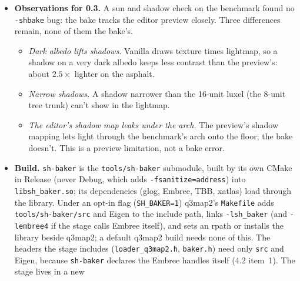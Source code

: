 \documentclass[11pt,a4paper]{article}
\begin{document}
\begin{itemize}
\begin{itemize}
    the trilinear blend takes in the row 128 units up, so a model near a light reads brighter than
    the floor under it; the README suggests a smaller $z$ for the town.
  \item \emph{Monte Carlo noise.} The draft and the stock check bake 128 samples per point; the
    pre-release and final presets above lower the noise. A9 judges the shipped preset and may
    change it.
  \item \emph{Hull seam inset.} A caulk face's bake polygon stops $1/32$ unit short of a drawn
    neighbour's plane (0.25 opened a strip; flush grazed edge-row rays), so a light within $1/32$
    unit of a drawn wall plane could still leak along it.
  \end{itemize}
\item \textbf{Observations for 0.3.} A sun and shadow check on the benchmark found no
  \texttt{-shbake} bug: the bake tracks the editor preview closely. Three differences remain, none
  of them the bake's.
  \begin{itemize}
  \item \emph{Dark albedo lifts shadows.} Vanilla draws texture times lightmap, so a shadow on a
    very dark albedo keeps less contrast than the preview's: about $2.5\times$ lighter on the
    asphalt.
  \item \emph{Narrow shadows.} A shadow narrower than the 16-unit luxel (the 8-unit tree trunk)
    can't show in the lightmap.
  \item \emph{The editor's shadow map leaks under the arch.} The preview's shadow mapping lets
    light through the benchmark's arch onto the floor; the bake doesn't. This is a preview
    limitation, not a bake error.
  \end{itemize}
\item \textbf{Build.} \texttt{sh-baker} is the \texttt{tools/sh-baker} submodule, built by its own
  CMake in Release (never Debug, which adds \texttt{-fsanitize=address}) into
  \texttt{libsh\_baker.so}; its dependencies (glog, Embree, TBB, xatlas) load through the library.
  Under an opt-in flag (\texttt{SH\_BAKER=1}) q3map2's \texttt{Makefile} adds
  \texttt{tools/sh-baker/src} and Eigen to the include path, links \texttt{-lsh\_baker} (and
  \texttt{-lembree4} if the stage calls Embree itself), and sets an rpath or installs the library
  beside q3map2; a default q3map2 build needs none of this. The headers the stage includes
  (\texttt{loader\_q3map2.h}, \texttt{baker.h}) need only \texttt{src} and Eigen, because
  \texttt{sh-baker} declares the Embree handles itself (4.2 item~1). The stage lives in a new

\end{itemize}
\end{document}
